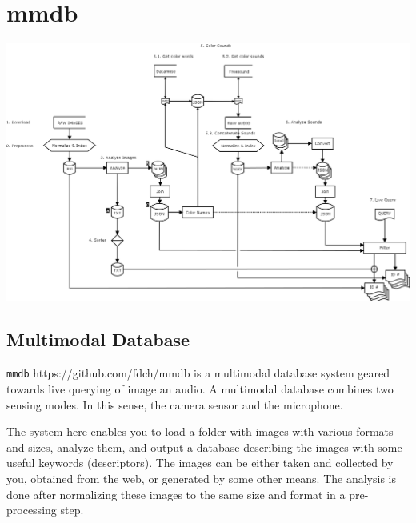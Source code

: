 \hypertarget{mmdb}{%
\section{mmdb}\label{mmdb}}

\includegraphics{dataflow.png}

\hypertarget{multimodal-database}{%
\subsection{Multimodal Database}\label{multimodal-database}}

\texttt{mmdb} https://github.com/fdch/mmdb is a multimodal database system geared towards live querying of image an audio. A multimodal database combines two sensing modes. In this sense, the camera sensor and the microphone.

The system here enables you to load a folder with images with various formats and sizes, analyze them, and output a database describing the images with some useful keywords (descriptors). The images can be either taken and collected by you, obtained from the web, or generated by some other means. The analysis is done after normalizing these images to the same size and format in a pre-processing step.

